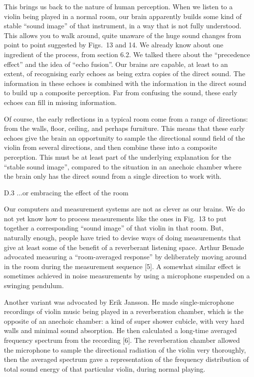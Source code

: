   This brings us back to the nature of human perception. When we listen to a 
  violin being played in a normal room, our brain apparently builds some kind 
  of stable “sound image” of that instrument, in a way that is not fully 
  understood. This allows you to walk around, quite unaware of the huge sound 
  changes from point to point suggested by Figs.\ 13 and 14. We already know 
  about one ingredient of the process, from section 6.2. We talked there about 
  the “precedence effect” and the idea of “echo fusion”. Our brains are 
  capable, at least to an extent, of recognising early echoes as being extra 
  copies of the direct sound. The information in these echoes is combined with 
  the information in the direct sound to build up a composite perception. Far 
  from confusing the sound, these early echoes can fill in missing information. 

  Of course, the early reflections in a typical room come from a range of 
  directions: from the walls, floor, ceiling, and perhaps furniture. This means 
  that these early echoes give the brain an opportunity to sample the 
  directional sound field of the violin from several directions, and then 
  combine these into a composite perception. This must be at least part of the 
  underlying explanation for the “stable sound image”, compared to the 
  situation in an anechoic chamber where the brain only has the direct sound 
  from a single direction to work with. 

  D.3 ...or embracing the effect of the room 

  Our computers and measurement systems are not as clever as our brains. We do 
  not yet know how to process measurements like the ones in Fig.\ 13 to put 
  together a corresponding “sound image” of that violin in that room. But, 
  naturally enough, people have tried to devise ways of doing measurements that 
  give at least some of the benefit of a reverberant listening space. Arthur 
  Benade advocated measuring a “room-averaged response” by deliberately moving 
  around in the room during the measurement sequence [5]. A somewhat similar 
  effect is sometimes achieved in noise measurements by using a microphone 
  suspended on a swinging pendulum. 

  Another variant was advocated by Erik Jansson. He made single-microphone 
  recordings of violin music being played in a reverberation chamber, which is 
  the opposite of an anechoic chamber: a kind of super shower cubicle, with 
  very hard walls and minimal sound absorption. He then calculated a long-time 
  averaged frequency spectrum from the recording [6]. The reverberation chamber 
  allowed the microphone to sample the directional radiation of the violin very 
  thoroughly, then the averaged spectrum gave a representation of the frequency 
  distribution of total sound energy of that particular violin, during normal 
  playing. 

